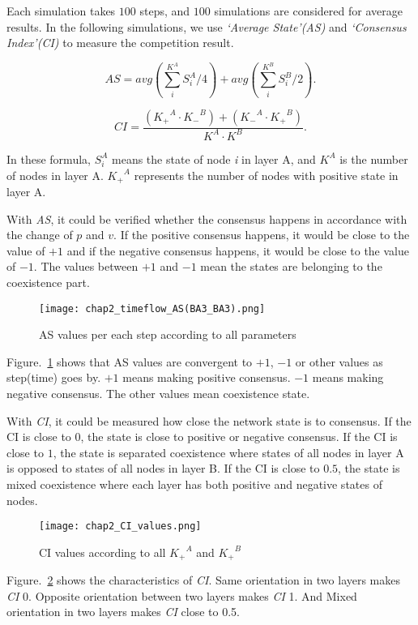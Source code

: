 Each simulation takes $100$ steps, and $100$ simulations are considered for average results. In the following simulations, we use \textit{`Average State'(AS)} and \textit{`Consensus Index'(CI)} to measure the competition result.

\begin{equation}
AS = avg\left( {\sum\limits_i^{{K^A}} {S_i^A/4} } \right) + avg\left( {\sum\limits_i^{{K^B}} {S_i^B/2} } \right).
\end{equation}

\begin{equation}
CI = \frac{{({K_ + }^A \cdot {K_ - }^B) + ({K_ - }^A \cdot {K_ + }^B)}}{{{K^A} \cdot {K^B}}}.
\end{equation}

In these formula, $S_i^A$ means the state of node \textit{i} in layer A, and $K^A$ is the number of nodes in layer A. ${K_ + }^A$ represents the number of nodes with positive state in layer A.   

With \textit{AS}, it could be verified whether the consensus happens in accordance with the change of $p$ and $v$.  If the positive consensus happens, it would be close to the value of $+1$ and if the negative consensus happens, it would be close to the value of $-1$. The values between $+1$ and $-1$ mean the states are belonging to the coexistence part.
\begin{figure}[!htb]
	\centering
	\texttt{[image: chap2\_timeflow\_AS(BA3\_BA3).png]}
	\caption{AS values per each step according to all parameters}
	\label{chap2_timeflow_AS(BA3_BA3)}
\end{figure}
Figure.~\ref{chap2_timeflow_AS(BA3_BA3)} shows that AS values are convergent to $+1$, $-1$ or other values as step(time) goes by. $+1$ means making positive consensus. $-1$ means making negative consensus. The other values mean coexistence state. 


With \textit{CI}, it could be measured how close the network state is to consensus. If the CI is close to $0$, the state is close to positive or negative consensus. If the CI is close to $1$, the state is separated coexistence where states of all nodes in layer A is opposed to states of all nodes in layer B. If the CI is close to $0.5$, the state is mixed coexistence where each layer has both positive and negative states of nodes.

\begin{figure}[!htb]
	\centering
	\texttt{[image: chap2\_CI\_values.png]}
	\caption{CI values according to all ${K_ + }^A$ and ${K_ + }^B$  }
	\label{chap2_CI_values}
\end{figure}
Figure.~\ref{chap2_CI_values} shows the characteristics of \textit{CI}. Same orientation in two layers makes \textit{CI} 0. Opposite orientation between two layers makes \textit{CI} 1. And Mixed orientation in two layers makes \textit{CI} close to 0.5. 

